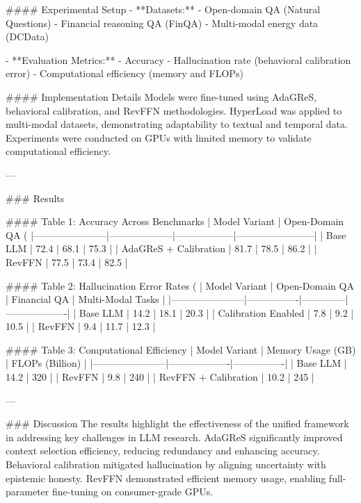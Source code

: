 #### Experimental Setup  
- **Datasets:**  
  - Open-domain QA (Natural Questions)  
  - Financial reasoning QA (FinQA)  
  - Multi-modal energy data (DCData)  

- **Evaluation Metrics:**  
  - Accuracy  
  - Hallucination rate (behavioral calibration error)  
  - Computational efficiency (memory and FLOPs)  

#### Implementation Details  
Models were fine-tuned using AdaGReS, behavioral calibration, and RevFFN methodologies. HyperLoad was applied to multi-modal datasets, demonstrating adaptability to textual and temporal data. Experiments were conducted on GPUs with limited memory to validate computational efficiency.

---

### Results  

#### Table 1: Accuracy Across Benchmarks  
| Model Variant         | Open-Domain QA (%
|-----------------------|--------------------|------------------|------------------------|  
| Base LLM             | 72.4              | 68.1            | 75.3                  |  
| AdaGReS + Calibration | 81.7              | 78.5            | 86.2                  |  
| RevFFN               | 77.5              | 73.4            | 82.5                  |  

#### Table 2: Hallucination Error Rates (%
| Model Variant         | Open-Domain QA | Financial QA | Multi-Modal Tasks |  
|-----------------------|----------------|--------------|-------------------|  
| Base LLM             | 14.2           | 18.1         | 20.3             |  
| Calibration Enabled  | 7.8            | 9.2          | 10.5             |  
| RevFFN               | 9.4            | 11.7         | 12.3             |  

#### Table 3: Computational Efficiency  
| Model Variant         | Memory Usage (GB) | FLOPs (Billion) |  
|-----------------------|-------------------|----------------|  
| Base LLM             | 14.2             | 320            |  
| RevFFN               | 9.8              | 240            |  
| RevFFN + Calibration | 10.2             | 245            |  

---

### Discussion  
The results highlight the effectiveness of the unified framework in addressing key challenges in LLM research. AdaGReS significantly improved context selection efficiency, reducing redundancy and enhancing accuracy. Behavioral calibration mitigated hallucination by aligning uncertainty with epistemic honesty. RevFFN demonstrated efficient memory usage, enabling full-parameter fine-tuning on consumer-grade GPUs.

